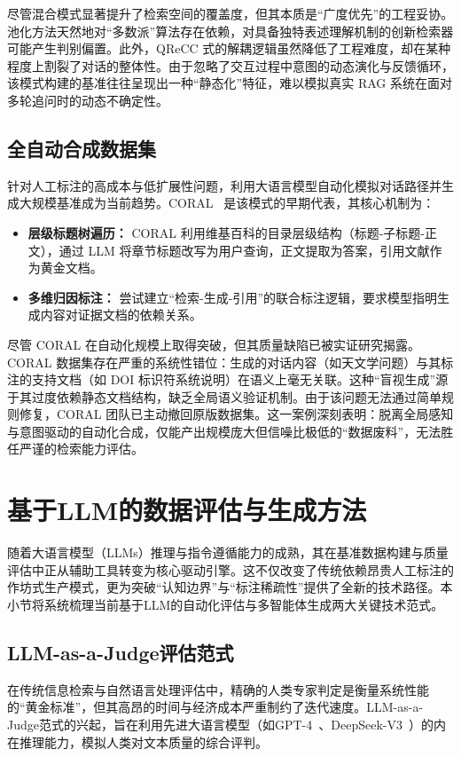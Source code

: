 尽管混合模式显著提升了检索空间的覆盖度，但其本质是“广度优先”的工程妥协。池化方法天然地对“多数派”算法存在依赖，对具备独特表述理解机制的创新检索器可能产生判别偏置。此外，QReCC 式的解耦逻辑虽然降低了工程难度，却在某种程度上割裂了对话的整体性。由于忽略了交互过程中意图的动态演化与反馈循环，该模式构建的基准往往呈现出一种“静态化”特征，难以模拟真实 RAG 系统在面对多轮追问时的动态不确定性。


\subsection{全自动合成数据集}

针对人工标注的高成本与低扩展性问题，利用大语言模型自动化模拟对话路径并生成大规模基准成为当前趋势。CORAL~\citep{Cheng2024CORALBM} 是该模式的早期代表，其核心机制为：
\begin{itemize}
    \item \textbf{层级标题树遍历：} CORAL 利用维基百科的目录层级结构（标题-子标题-正文），通过 LLM 将章节标题改写为用户查询，正文提取为答案，引用文献作为黄金文档。
    \item \textbf{多维归因标注：} 尝试建立“检索-生成-引用”的联合标注逻辑，要求模型指明生成内容对证据文档的依赖关系。
\end{itemize}

尽管 CORAL 在自动化规模上取得突破，但其质量缺陷已被实证研究揭露。CORAL 数据集存在严重的系统性错位：生成的对话内容（如天文学问题）与其标注的支持文档（如 DOI 标识符系统说明）在语义上毫无关联。这种“盲视生成”源于其过度依赖静态文档结构，缺乏全局语义验证机制。由于该问题无法通过简单规则修复，CORAL 团队已主动撤回原版数据集。这一案例深刻表明：脱离全局感知与意图驱动的自动化合成，仅能产出规模庞大但信噪比极低的“数据废料”，无法胜任严谨的检索能力评估。



\section{基于LLM的数据评估与生成方法}
随着大语言模型（LLMs）推理与指令遵循能力的成熟，其在基准数据构建与质量评估中正从辅助工具转变为核心驱动引擎。这不仅改变了传统依赖昂贵人工标注的作坊式生产模式，更为突破“认知边界”与“标注稀疏性”提供了全新的技术路径。本小节将系统梳理当前基于LLM的自动化评估与多智能体生成两大关键技术范式。
\subsection{LLM-as-a-Judge评估范式}
在传统信息检索与自然语言处理评估中，精确的人类专家判定是衡量系统性能的“黄金标准”，但其高昂的时间与经济成本严重制约了迭代速度。LLM-as-a-Judge范式的兴起，旨在利用先进大语言模型（如GPT-4~\citep{openai2023gpt4}、DeepSeek-V3~\citep{deepseekai2024deepseekv3}）的内在推理能力，模拟人类对文本质量的综合评判。

